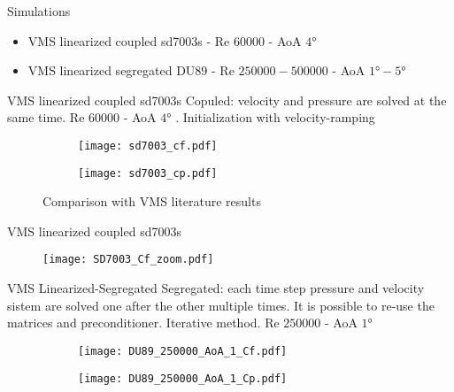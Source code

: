 



\begin{frame}{Simulations}
\begin{itemize}
\item VMS linearized coupled sd7003s - Re $\num{60000}$ - AoA $\ang{4}$ 
\item VMS linearized segregated DU89 - Re $\num{250000}-\num{500000}$ - AoA $\ang{1}-\ang{5}$ 
\end{itemize}
\end{frame}


\begin{frame}{VMS linearized coupled sd7003s}
Copuled: velocity and pressure are solved at the same time.
Re $\num{60000}$ - AoA $\ang{4}$ . Initialization with velocity-ramping
\begin{figure}[h]
     \centering          
     \begin{subfigure}[h]{0.45\textwidth}
              \centering
         \texttt{[image: sd7003\_cf.pdf]}
    \end{subfigure}
          \hfill
     \begin{subfigure}[h]{0.45\textwidth}
      \centering
         \texttt{[image: sd7003\_cp.pdf]}
     \end{subfigure}
\caption{Comparison with VMS literature results}
     \end{figure} 
     
\end{frame}

\begin{frame}{ VMS linearized coupled sd7003s}
\begin{figure}[h]
     \centering          
         \texttt{[image: SD7003\_Cf\_zoom.pdf]}
     \end{figure} 
\end{frame}




\begin{frame}{VMS Linearized-Segregated}
Segregated: each time step pressure and velocity sistem are solved one after the other multiple times. It is possible to re-use the matrices and preconditioner. Iterative method.
Re $\num{250000}$ - AoA $\ang{1}$ 

\begin{figure}[h]
     \centering          
     \begin{subfigure}[h]{0.45\textwidth}
              \centering
         \texttt{[image: DU89\_250000\_AoA\_1\_Cf.pdf]}
    \end{subfigure}
          \hfill
     \begin{subfigure}[h]{0.45\textwidth}
      \centering
         \texttt{[image: DU89\_250000\_AoA\_1\_Cp.pdf]}
     \end{subfigure}
     \end{figure} 
 \end{frame}

